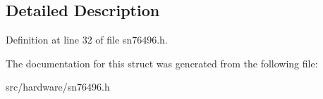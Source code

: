 \subsection{Detailed Description}


Definition at line 32 of file sn76496.\-h.



The documentation for this struct was generated from the following file\-:\begin{DoxyCompactItemize}
\item 
src/hardware/sn76496.\-h\end{DoxyCompactItemize}
